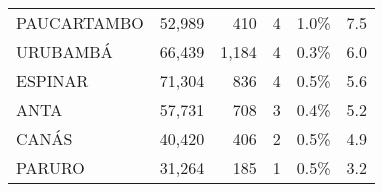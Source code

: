 \begin{tabular}{lrrrrr}
	\cellcolor[HTML]{FFCE93}PAUCARTAMBO   & 52,989                                                         & 410                                                                  & 4                                                              & 1.0\%                                                                  & 7.5                                                                                                                                \\
	\cellcolor[HTML]{FFFFC7}URUBAMBÁ      & 66,439                                                         & 1,184                                                                & 4                                                              & 0.3\%                                                                  & 6.0                                                                                                                                \\
	\cellcolor[HTML]{FFFFC7}ESPINAR       & 71,304                                                         & 836                                                                  & 4                                                              & 0.5\%                                                                  & 5.6                                                                                                                                \\
	\cellcolor[HTML]{FFFFC7}ANTA          & 57,731                                                         & 708                                                                  & 3                                                              & 0.4\%                                                                  & 5.2                                                                                                                                \\
	\cellcolor[HTML]{FFFFC7}CANÁS         & 40,420                                                         & 406                                                                  & 2                                                              & 0.5\%                                                                  & 4.9                                                                                                                                \\
	\cellcolor[HTML]{FFFFC7}PARURO        & 31,264                                                         & 185                                                                  & 1                                                              & 0.5\%                                                                  & 3.2                                                                                                                                \\

\end{tabular}
